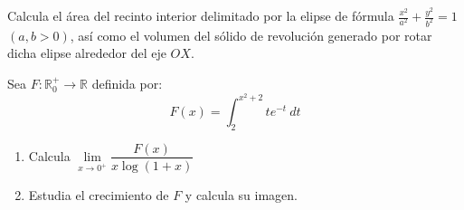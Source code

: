 \documentclass[12pt]{article}
\begin{document}
    \begin{ejercicio}[2 puntos]
        Calcula el área del recinto interior delimitado por la elipse de fórmula $\frac{x^2}{a^2}+\frac{y^2}{b^2} = 1$ $(a,b>0)$, así como el volumen del sólido de revolución generado por rotar dicha elipse alrededor del eje $OX$.
    \end{ejercicio}

    \begin{ejercicio}[2 puntos]
        Sea $F:\mathbb{R}^+_0\longrightarrow \mathbb{R}$ definida por:
        \begin{equation*}
            F(x) = \int_{2}^{x^2+2} te^{-t}~dt 
        \end{equation*}
        \begin{enumerate}[label=\alph*)]
            \item Calcula $\lim\limits_{x\to0^+}\dfrac{F(x)}{x\log(1+x)}$
            \item Estudia el crecimiento de $F$ y calcula su imagen.
        \end{enumerate}
    \end{ejercicio}
\end{document}
